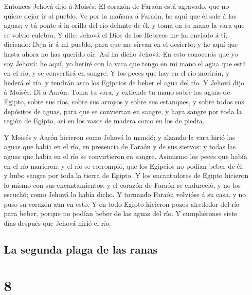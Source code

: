  Entonces Jehová dijo á Moisés: El corazón de Faraón está
agravado, que no quiere dejar ir al pueblo.  Ve por la
mañana á Faraón, he aquí que él sale á las aguas; y tú ponte á la orilla
del río delante de él, y toma en tu mano la vara que se volvió culebra,
 Y dile: Jehová el Dios de los Hebreos me ha enviado á
ti, diciendo: Deja ir á mi pueblo, para que me sirvan en el desierto; y
he aquí que hasta ahora no has querido oir.  Así ha dicho
Jehová: En esto conocerás que yo soy Jehová: he aquí, yo heriré con la
vara que tengo en mi mano el agua que está en el río, y se convertirá en
sangre:  Y los peces que hay en el río morirán, y hederá
el río, y tendrán asco los Egipcios de beber el agua del río.
 Y Jehová dijo á Moisés: Di á Aarón: Toma tu vara, y
extiende tu mano sobre las aguas de Egipto, sobre sus ríos, sobre sus
arroyos y sobre sus estanques, y sobre todos sus depósitos de aguas,
para que se conviertan en sangre, y haya sangre por toda la región de
Egipto, así en los vasos de madera como en los de piedra.

 Y Moisés y Aarón hicieron como Jehová lo mandó; y
alzando la vara hirió las aguas que había en el río, en presencia de
Faraón y de sus siervos; y todas las aguas que había en el río se
convirtieron en sangre.  Asimismo los peces que había en
el río murieron; y el río se corrompió, que los Egipcios no podían beber
de él: y hubo sangre por toda la tierra de Egipto.  Y los
encantadores de Egipto hicieron lo mismo con sus encantamientos: y el
corazón de Faraón se endureció, y no los escuchó; como Jehová lo había
dicho.  Y tornando Faraón volvióse á su casa, y no puso
su corazón aun en esto.  Y en todo Egipto hicieron pozos
alrededor del río para beber, porque no podían beber de las aguas del
río.  Y cumpliéronse siete días después que Jehová hirió
el río.

\hypertarget{la-segunda-plaga-de-las-ranas}{%
\subsection{La segunda plaga de las
ranas}\label{la-segunda-plaga-de-las-ranas}}

\hypertarget{section-7}{%
\section{8}\label{section-7}}

